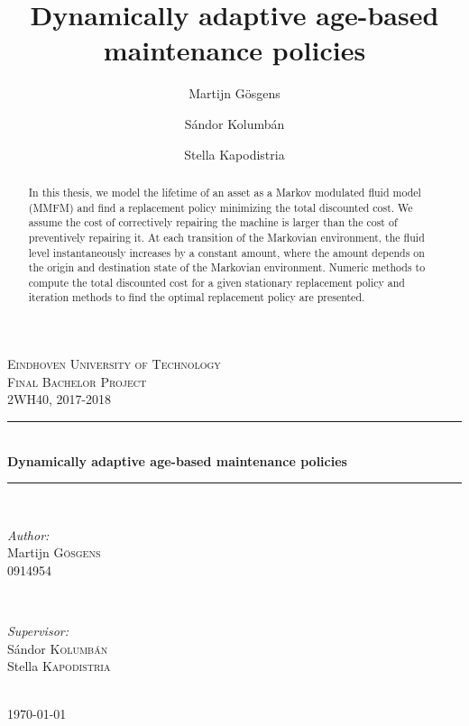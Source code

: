 \documentclass[a4paper]{thesis}
\theoremstyle{definition}
\begin{document}
\title{Dynamically adaptive age-based maintenance policies}
\author{Martijn G\"{o}sgens\\
\and
S\'{a}ndor Kolumb\'{a}n\\
\and
Stella Kapodistria
}
\begin{titlepage}

\newcommand{\HRule}{\rule{\linewidth}{0.5mm}} 

\center 
 

\textsc{\LARGE Eindhoven University of Technology}\\[1.5cm] 

\textsc{\Large Final Bachelor Project}\\[0.5cm] 
\textsc{\large 2WH40, 2017-2018}\\[0.5cm] 

\HRule \\[0.4cm]
{ \huge \bfseries Dynamically adaptive age-based maintenance policies}\\[0.4cm] 
\HRule \\[1.5cm]
 

\begin{minipage}{0.4\textwidth}
\begin{flushleft} \large
\emph{Author:}\\
Martijn \textsc{G\"{o}sgens}\\
0914954 
\end{flushleft}
\end{minipage}
~
\begin{minipage}{0.4\textwidth}
\begin{flushright} \large
\emph{Supervisor:} \\
S\'{a}ndor \textsc{Kolumb\'{a}n}\\ 
Stella \textsc{Kapodistria}
\end{flushright}
\end{minipage}\\[2cm]



{\large \today}\\[2cm] 


 

\vfill 

\end{titlepage} 

\begin{abstract}
	In this thesis, we model the lifetime of an asset as a Markov modulated fluid model (MMFM) and find a replacement policy minimizing the total discounted cost.
	We assume the cost of correctively repairing the machine is larger than the cost of preventively repairing it.
	At each transition of the Markovian environment, the fluid level instantaneously increases by a constant amount, where the amount depends on the origin and destination state of the Markovian environment.
	Numeric methods to compute the total discounted cost for a given stationary replacement policy and iteration methods to find the optimal replacement policy are presented.
\end{abstract}
\end{document}
